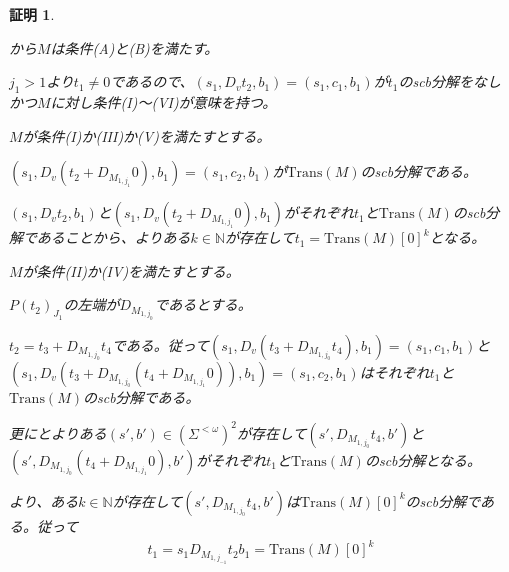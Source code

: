 \documentclass[dvipdfmx,uplatex]{jsarticle}
\theoremstyle{customnonumberbreakfortheorem}
\theoremstyle{customnonumberbreakforproof}
\newtheorem{hideableproof}{証明}
\begin{document}
\begin{hideableproof}
	\begin{indented}
		\item
		\begin{indented}
			\item
			\begin{indented}
				\item {}から\(M\)は条件(A)と(B)を満たす。
				\item \(j_1 > 1\)より\(t_1 \neq 0\)であるので、\((s_1,D_v t_2,b_1) = (s_1,c_1,b_1)\)が\(t_1\)のscb分解をなしかつ\(M\)に対し条件(I)～(VI)が意味を持つ。
				\item \(M\)が条件(I)か(III)か(V)を満たすとする。
				\begin{indented}
					\item \((s_1,D_v(t_2 + D_{M_{1,j_1}} 0),b_1) = (s_1,c_2,b_1)\)が\(\textrm{Trans}(M)\)のscb分解である。
					\item \((s_1,D_v t_2,b_1)\)と\((s_1,D_v(t_2 + D_{M_{1,j_1}} 0),b_1)\)がそれぞれ\(t_1\)と\(\textrm{Trans}(M)\)のscb分解であることから、よりある\(k \in \mathbb{N}\)が存在して\(t_1 = \textrm{Trans}(M)[0]^k\)となる。
				\end{indented}
				\item \(M\)が条件(II)か(IV)を満たすとする。
				\begin{indented}
					\item \(P(t_2)_{J_1}\)の左端が\(D_{M_{1,j_0}}\)であるとする。
					\begin{indented}
						\item \(t_2 = t_3 + D_{M_{1,j_0}} t_4\)である。従って\((s_1,D_v(t_3 + D_{M_{1,j_0}} t_4),b_1) = (s_1,c_1,b_1)\)と\((s_1,D_v(t_3 + D_{M_{1,j_0}}(t_4 +D_{M_{1,j_1}} 0)),b_1) = (s_1,c_2,b_1)\)はそれぞれ\(t_1\)と\(\textrm{Trans}(M)\)のscb分解である。
						\item 更にとよりある\((s',b') \in (\Sigma^{< \omega})^2\)が存在して\((s',D_{M_{1,j_0}} t_4,b')\)と\((s',D_{M_{1,j_0}}(t_4 + D_{M_{1,j_1}} 0),b')\)がそれぞれ\(t_1\)と\(\textrm{Trans}(M)\)のscb分解となる。
						\item {}より、ある\(k \in \mathbb{N}\)が存在して\((s',D_{M_{1,j_0}} t_4,b')\)は\(\textrm{Trans}(M)[0]^k\)のscb分解である。従って
						\begin{eqnarray*}
						t_1 = s_1 D_{M_{1,j_{-1}}} t_2 b_1 = \textrm{Trans}(M)[0]^k
						\end{eqnarray*}

\end{indented}
\end{indented}
\end{indented}
\end{indented}
\end{indented}
\end{hideableproof}
\end{document}
